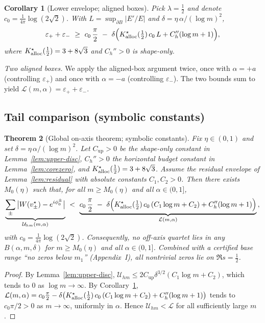 \documentclass[11pt]{article}
\numberwithin{equation}{section}
\newtheorem{theorem}{Theorem}[section]
\newtheorem{corollary}[theorem]{Corollary}
\theoremstyle{remark}
\begin{document}
\begin{corollary}[Lower envelope; aligned boxes]\label{cor:lower}
Pick $\lambda=\tfrac12$ and denote $c_0=\frac{1}{4\pi}\log(2\sqrt{2})$. With $L=\sup_{\partial B}|E'/E|$ and $\delta=\eta\,\alpha/(\log m)^2$,
\[
\varepsilon_+ + \varepsilon_- \ \ge\ c_0\,\frac{\pi}{2}\ -\ \delta\Big( K_{\rm alloc}^{\star}(\tfrac12)\,c_0\,L + C_h''(\log m+1) \Big),
\]
where $K_{\rm alloc}^{\star}(\tfrac12)=3+8\sqrt{3}$ and $C_h''>0$ is shape-only.
\end{corollary}

\noindent\emph{Two aligned boxes.} We apply the aligned-box argument twice, once with $\alpha=+a$ (controlling $\varepsilon_+$) and once with $\alpha=-a$ (controlling $\varepsilon_-$). The two bounds sum to yield $\mathcal L(m,\alpha)=\varepsilon_+ + \varepsilon_-$.

\subsection{Tail comparison (symbolic constants)}\label{subsec:comparison}

\begin{theorem}[Global on-axis theorem; symbolic constants]\label{thm:tail-symbolic}
Fix $\eta\in(0,1)$ and set $\delta=\eta\,\alpha/(\log m)^2$. Let $C_{\mathrm{up}}>0$ be the shape-only constant in Lemma~\ref{lem:upper-disc}, $C_h''>0$ the horizontal budget constant in Lemma~\ref{lem:corezero}, and $K_{\rm alloc}^{\star}(\tfrac12)=3+8\sqrt{3}$. Assume the residual envelope of Lemma~\ref{lem:residual} with absolute constants $C_1,C_2>0$. Then there exists $M_0(\eta)$ such that, for all $m\ge M_0(\eta)$ and all $\alpha\in(0,1]$,
\[
\underbrace{\sum_{\pm}\big|W(v_\pm^\star)-e^{i\phi_0^\pm}\big|}_{\mathcal U_{hm}(m,\alpha)}
\ <\
\underbrace{c_0\,\frac{\pi}{2}\ -\ \delta\Big( K_{\rm alloc}^{\star}(\tfrac12)\,c_0\,(C_1\log m+C_2) + C_h''(\log m+1) \Big)}_{\mathcal L(m,\alpha)}\,,
\]
with $c_0=\frac{1}{4\pi}\log(2\sqrt{2})$. Consequently, no off-axis quartet lies in any $B(\alpha,m,\delta)$ for $m\ge M_0(\eta)$ and all $\alpha\in(0,1]$. Combined with a certified base range “no zeros below $m_1$” (Appendix~I), all nontrivial zeros lie on $\Re s=\tfrac12$.
\end{theorem}

\begin{proof}
By Lemma~\ref{lem:upper-disc}, $\mathcal U_{hm}\le 2C_{\mathrm{up}}\delta^{3/2}(C_1\log m+C_2)$, which tends to $0$ as $\log m\to\infty$. By Corollary~\ref{cor:lower}, $\mathcal L(m,\alpha)=c_0\frac{\pi}{2}-\delta\big(K_{\rm alloc}^{\star}(\tfrac12)\,c_0\,(C_1\log m+C_2)+C_h''(\log m+1)\big)$ tends to $c_0\pi/2>0$ as $m\to\infty$, uniformly in $\alpha$. Hence $\mathcal U_{hm}<\mathcal L$ for all sufficiently large $m$.
\end{proof}
\end{document}
